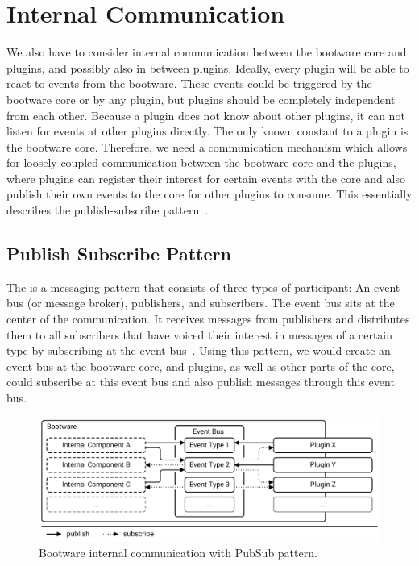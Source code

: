 \section{Internal Communication}
\label{design:internalcomm}

We also have to consider internal communication between the bootware core and plugins, and possibly also in between plugins.
Ideally, every plugin will be able to react to events from the bootware.
These events could be triggered by the bootware core or by any plugin, but plugins should be completely independent from each other.
Because a plugin does not know about other plugins, it can not listen for events at other plugins directly.
The only known constant to a plugin is the bootware core.
Therefore, we need a communication mechanism which allows for loosely coupled communication between the bootware core and the plugins, where plugins can register their interest for certain events with the core and also publish their own events to the core for other plugins to consume.
This essentially describes the publish-subscribe pattern~\autocite{pubsub}.

\subsection{Publish Subscribe Pattern}

The  is a messaging pattern that consists of three types of participant: An event bus (or message broker), publishers, and subscribers.
The event bus sits at the center of the communication.
It receives messages from publishers and distributes them to all subscribers that have voiced their interest in messages of a certain type by subscribing at the event bus~\autocite{pubsub}.
Using this pattern, we would create an event bus at the bootware core, and plugins, as well as other parts of the core, could subscribe at this event bus and also publish messages through this event bus.

\begin{figure}[!htbp]
	\centering
	\includegraphics[resolution=600]{design/assets/pubsub}
	\caption{Bootware internal communication with PubSub pattern.}
	\label{image:pubsub}
\end{figure}

